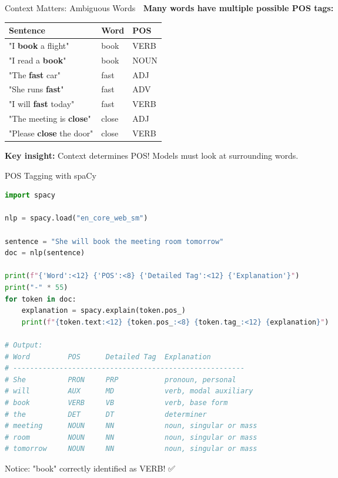 \documentclass[aspectratio=169]{beamer}
\begin{document}
\begin{frame}{Context Matters: Ambiguous Words 🔄}
    \textbf{Many words have multiple possible POS tags:}

    \vspace{0.5em}
    \begin{center}
        \begin{tabular}{lll}
            \toprule
            \textbf{Sentence} & \textbf{Word} & \textbf{POS} \\
            \midrule
            "I \textbf{book} a flight" & book & VERB \\
            "I read a \textbf{book}" & book & NOUN \\
            \midrule
            "The \textbf{fast} car" & fast & ADJ \\
            "She runs \textbf{fast}" & fast & ADV \\
            "I will \textbf{fast} today" & fast & VERB \\
            \midrule
            "The meeting is \textbf{close}" & close & ADJ \\
            "Please \textbf{close} the door" & close & VERB \\
            \bottomrule
        \end{tabular}
    \end{center}

    \vspace{0.5em}
    \textbf{Key insight:} Context determines POS! Models must look at surrounding words.
\end{frame}

\begin{frame}[fragile]{POS Tagging with spaCy 🚀}
    \begin{lstlisting}[language=Python]
import spacy

nlp = spacy.load("en_core_web_sm")

sentence = "She will book the meeting room tomorrow"
doc = nlp(sentence)

print(f"{'Word':<12} {'POS':<8} {'Detailed Tag':<12} {'Explanation'}")
print("-" * 55)
for token in doc:
    explanation = spacy.explain(token.pos_)
    print(f"{token.text:<12} {token.pos_:<8} {token.tag_:<12} {explanation}")

# Output:
# Word         POS      Detailed Tag  Explanation
# -------------------------------------------------------
# She          PRON     PRP           pronoun, personal
# will         AUX      MD            verb, modal auxiliary
# book         VERB     VB            verb, base form
# the          DET      DT            determiner
# meeting      NOUN     NN            noun, singular or mass
# room         NOUN     NN            noun, singular or mass
# tomorrow     NOUN     NN            noun, singular or mass
    \end{lstlisting}

    Notice: "book" correctly identified as VERB! ✅
\end{frame}
\end{document}
